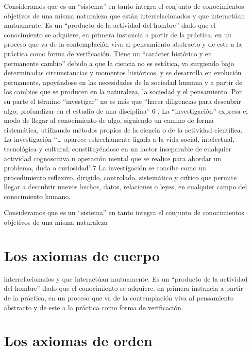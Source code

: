 \documentclass[12pt,]{krantz}
\theoremstyle{definition}
\theoremstyle{definition}
\theoremstyle{definition}
\theoremstyle{remark}
\begin{document}
Consideramos que es un ``sistema'' en tanto integra el conjunto de
conocimientos
objetivos
de
una
misma
naturaleza
que
están
interrelacionados y que interactúan mutuamente.
Es un ``producto de la actividad del hombre'' dado que el conocimiento
se adquiere, en primera instancia a partir de la práctica, en un proceso que
va de la contemplación viva al pensamiento abstracto y de este a la práctica
como forma de verificación.
Tiene un ``carácter histórico y en permanente cambio'' debido a que la
ciencia no es estática, va surgiendo bajo determinadas circunstancias y
momentos históricos, y se desarrolla en evolución permanente, apoyándose
en las necesidades de la sociedad humana y a partir de los cambios que se
producen en la naturaleza, la sociedad y el pensamiento.
Por su parte el término ``investigar'' no es más que ``hacer diligencias para
descubrir algo; profundizar en el estudio de una disciplina'' 6
.
La ``investigación''
expresa el modo de llegar al conocimiento de algo,
siguiendo un camino de forma sistemática, utilizando métodos propios de la
ciencia o de la actividad científica. La investigación ``\ldots{} aparece estrechamente
ligada a la vida social, intelectual, tecnológica y cultural; constituyéndose en un
factor inseparable de cualquier actividad cognoscitiva u operación mental que se
realice para abordar un problema, duda o curiosidad''.7
La investigación se concibe como un procedimiento reflexivo, dirigido,
controlado, sistemático y crítico que permite llegar a descubrir nuevos
hechos, datos, relaciones o leyes, en cualquier campo del conocimiento
humano.

Consideramos que es un ``sistema'' en tanto integra el conjunto de
conocimientos
objetivos
de
una
misma
naturaleza

\hypertarget{los-axiomas-de-cuerpo}{%
\section{Los axiomas de cuerpo}\label{los-axiomas-de-cuerpo}}

interrelacionados y que interactúan mutuamente.
Es un ``producto de la actividad del hombre'' dado que el conocimiento
se adquiere, en primera instancia a partir de la práctica, en un proceso que
va de la contemplación viva al pensamiento abstracto y de este a la práctica
como forma de verificación.

\hypertarget{los-axiomas-de-orden}{%
\section{Los axiomas de orden}\label{los-axiomas-de-orden}}
\end{document}
